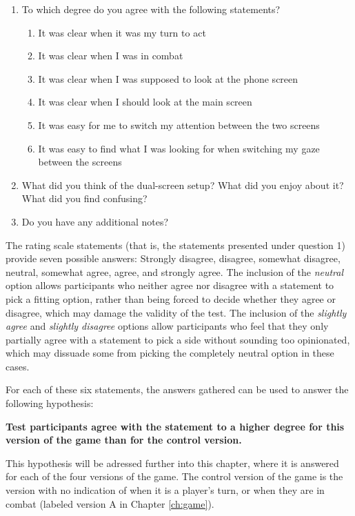 \begin{enumerate}
	\item To which degree do you agree with the following statements?
	\begin{enumerate}
		\item It was clear when it was my turn to act
		\item It was clear when I was in combat
		\item It was clear when I was supposed to look at the phone screen
		\item It was clear when I should look at the main screen
		\item It was easy for me to switch my attention between the two screens
		\item It was easy to find what I was looking for when switching my gaze between the screens
	\end{enumerate}
	\item What did you think of the dual-screen setup? What did you enjoy about it? What did you find confusing?
	\item Do you have any additional notes?
\end{enumerate}

The rating scale statements (that is, the statements presented under question 1) provide seven possible answers: Strongly disagree, disagree, somewhat disagree, neutral, somewhat agree, agree, and strongly agree. The inclusion of the \textit{neutral} option allows participants who neither agree nor disagree with a statement to pick a fitting option, rather than being forced to decide whether they agree or disagree, which may damage the validity of the test. The inclusion of the \textit{slightly agree} and \textit{slightly disagree} options allow participants who feel that they only partially agree with a statement to pick a side without sounding too opinionated, which may dissuade some from picking the completely neutral option in these cases.

For each of these six statements, the answers gathered can be used to answer the following hypothesis:

\begin{changemargin}{1cm}{1cm}
\textbf{Test participants agree with the statement to a higher degree for this version of the game than for the control version.}
\end{changemargin}

This hypothesis will be adressed further into this chapter, where it is answered for each of the four versions of the game. The control version of the game is the version with no indication of when it is a player's turn, or when they are in combat (labeled version A in Chapter \ref{ch:game}).

